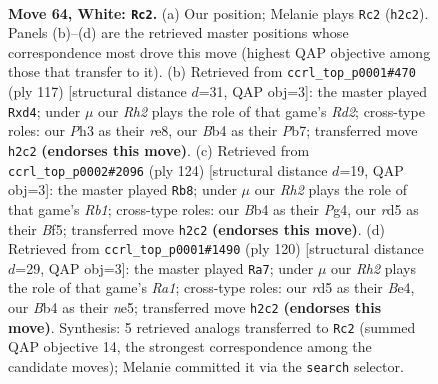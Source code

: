 \documentclass[11pt]{article}
\begin{document}
\clearpage

\begin{figure}[p]\centering
\begin{subfigure}{0.46\textwidth}\centering
\resizebox{\linewidth}{!}{%
\newchessgame
\chessboard[
  setfen={6k1/5p2/5n2/3r4/pB3P1p/P4K1P/7R/8 w - - 3 64},
  showmover=false,
  pgfstyle=straightmove, color=movearrow, markmove={h2-c2}
]}
\caption{}
\end{subfigure}\hfill
\begin{subfigure}{0.46\textwidth}\centering
\resizebox{\linewidth}{!}{%
\newchessgame
\chessboard[
  setfen={4R3/1p1r4/p5k1/P1P5/3N1P2/5K2/8/8 b - - 0 59},
  showmover=false,
  pgfstyle=straightmove, color=movearrow, markmove={d7-d4}
]}
\caption{}
\end{subfigure}
\\[4pt]
\begin{subfigure}{0.46\textwidth}\centering
\resizebox{\linewidth}{!}{%
\newchessgame
\chessboard[
  setfen={8/8/3r1p2/k1p2Bp1/2n3P1/4P3/5P2/1R2K3 w - - 8 63},
  showmover=false,
  pgfstyle=straightmove, color=movearrow, markmove={b1-b8}
]}
\caption{}
\end{subfigure}\hfill
\begin{subfigure}{0.46\textwidth}\centering
\resizebox{\linewidth}{!}{%
\newchessgame
\chessboard[
  setfen={8/5p2/3r1k2/1p2n3/1P2B1p1/4P3/4KP2/R7 w - - 2 61},
  showmover=false,
  pgfstyle=straightmove, color=movearrow, markmove={a1-a7}
]}
\caption{}
\end{subfigure}
\caption{\textbf{Move 64, White: \texttt{Rc2}.} (a) Our position; Melanie plays \texttt{Rc2} (\texttt{h2c2}). Panels (b)--(d) are the retrieved master positions whose correspondence most drove this move (highest QAP objective among those that transfer to it). (b) Retrieved from \texttt{ccrl\_top\_p0001\#470} (ply 117) [structural distance $d$=31, QAP obj=3]: the master played \texttt{Rxd4}; under $\mu$ our \emph{Rh2} plays the role of that game's \emph{Rd2}; cross-type roles: our \emph{P}h3 as their \emph{r}e8, our \emph{B}b4 as their \emph{P}b7; transferred move \texttt{h2c2} \textbf{(endorses this move)}. (c) Retrieved from \texttt{ccrl\_top\_p0002\#2096} (ply 124) [structural distance $d$=19, QAP obj=3]: the master played \texttt{Rb8}; under $\mu$ our \emph{Rh2} plays the role of that game's \emph{Rb1}; cross-type roles: our \emph{B}b4 as their \emph{P}g4, our \emph{r}d5 as their \emph{B}f5; transferred move \texttt{h2c2} \textbf{(endorses this move)}. (d) Retrieved from \texttt{ccrl\_top\_p0001\#1490} (ply 120) [structural distance $d$=29, QAP obj=3]: the master played \texttt{Ra7}; under $\mu$ our \emph{Rh2} plays the role of that game's \emph{Ra1}; cross-type roles: our \emph{r}d5 as their \emph{B}e4, our \emph{B}b4 as their \emph{n}e5; transferred move \texttt{h2c2} \textbf{(endorses this move)}. Synthesis: 5 retrieved analogs transferred to \texttt{Rc2} (summed QAP objective 14, the strongest correspondence among the candidate moves); Melanie committed it via the \texttt{search} selector.}
\label{fig:thought-m126}
\end{figure}
\end{document}
